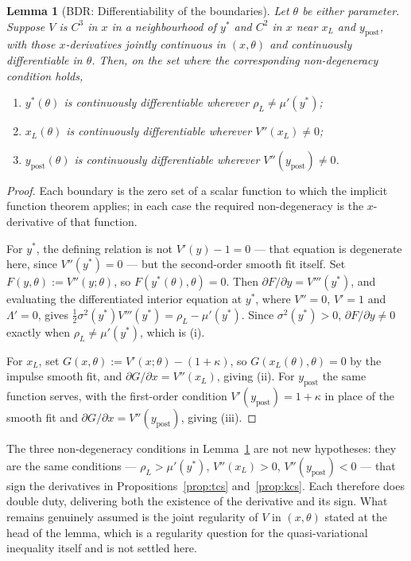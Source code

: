 \documentclass[11pt]{article}
\newtheorem{lemma}{Lemma}
\theoremstyle{remark}
\begin{document}
\begin{lemma}[BDR: Differentiability of the boundaries]
\label{lem:bdr}
Let $\theta$ be either parameter. Suppose $V$ is $C^3$ in $x$ in a
neighbourhood of $y^*$ and $C^2$ in $x$ near $x_L$ and
$y_{\mathrm{post}}$, with those $x$-derivatives jointly continuous in
$(x,\theta)$ and continuously differentiable in $\theta$. Then, on the set
where the corresponding non-degeneracy condition holds,
\begin{enumerate}
\item[(i)] $y^*(\theta)$ is continuously differentiable wherever
  $\rho_L \ne \mu'(y^*)$;
\item[(ii)] $x_L(\theta)$ is continuously differentiable wherever
  $V''(x_L) \ne 0$;
\item[(iii)] $y_{\mathrm{post}}(\theta)$ is continuously differentiable
  wherever $V''(y_{\mathrm{post}}) \ne 0$.
\end{enumerate}
\end{lemma}

\begin{proof}
Each boundary is the zero set of a scalar function to which the implicit
function theorem applies; in each case the required non-degeneracy is the
$x$-derivative of that function.

For $y^*$, the defining relation is not $V'(y)-1=0$ --- that equation is
degenerate here, since $V''(y^*)=0$ --- but the second-order smooth fit
itself. Set $F(y,\theta) := V''(y;\theta)$, so $F(y^*(\theta),\theta)=0$.
Then $\partial F/\partial y = V'''(y^*)$, and evaluating the differentiated
interior equation at $y^*$, where $V''=0$, $V'=1$ and $\Lambda'=0$, gives
$\tfrac12\sigma^2(y^*)V'''(y^*) = \rho_L - \mu'(y^*)$. Since
$\sigma^2(y^*)>0$, $\partial F/\partial y \ne 0$ exactly when
$\rho_L \ne \mu'(y^*)$, which is (i).

For $x_L$, set $G(x,\theta) := V'(x;\theta) - (1+\kappa)$, so
$G(x_L(\theta),\theta) = 0$ by the impulse smooth fit, and
$\partial G/\partial x = V''(x_L)$, giving (ii). For
$y_{\mathrm{post}}$ the same function serves, with the first-order
condition $V'(y_{\mathrm{post}}) = 1+\kappa$ in place of the smooth fit
and $\partial G/\partial x = V''(y_{\mathrm{post}})$, giving (iii).
\end{proof}

\noindent
The three non-degeneracy conditions in Lemma~\ref{lem:bdr} are not new
hypotheses: they are the same conditions --- $\rho_L > \mu'(y^*)$,
$V''(x_L)>0$, $V''(y_{\mathrm{post}})<0$ --- that sign the derivatives in
Propositions~\ref{prop:tcs} and~\ref{prop:kcs}. Each therefore does double
duty, delivering both the existence of the derivative and its sign. What
remains genuinely assumed is the joint regularity of $V$ in $(x,\theta)$
stated at the head of the lemma, which is a regularity question for the
quasi-variational inequality itself and is not settled here.
\end{document}
